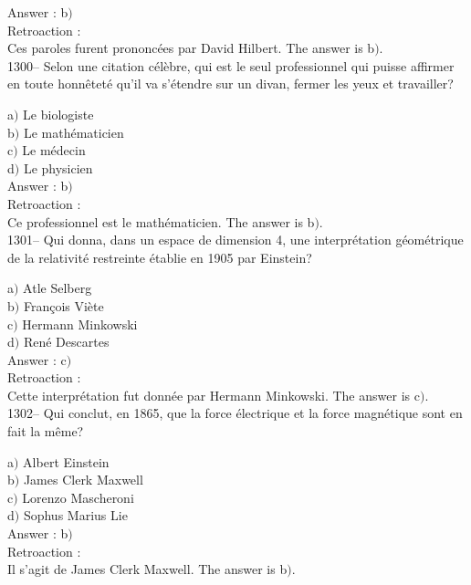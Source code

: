 ﻿\documentclass[letterpaper, 12pt]{article}
\begin{document}
Answer : b$)$\\

Retroaction : \\
Ces paroles furent prononc\'ees par David Hilbert.
The answer is  b$)$.\\

1300-- Selon une citation c\'el\`ebre, qui est le seul professionnel
qui puisse affirmer en toute honn\^etet\'e qu'il va s'\'etendre sur
un divan, fermer les yeux et travailler?

a$)$ Le biologiste \\
b$)$ Le math\'ematicien \\
c$)$ Le m\'edecin \\
d$)$ Le physicien\\

Answer : b$)$\\

Retroaction : \\
Ce professionnel est le math\'ematicien.
The answer is  b$)$.\\

1301-- Qui donna, dans un espace de dimension 4, une
interpr\'etation g\'eom\'etrique de la relativit\'e restreinte
\'etablie en 1905 par Einstein?

a$)$ Atle Selberg \\
b$)$ Fran\c cois Vi\`ete \\
c$)$ Hermann Minkowski \\
d$)$ Ren\'e Descartes\\

Answer : c$)$\\

Retroaction : \\
Cette interpr\'etation fut donn\'ee par Hermann Minkowski.
The answer is  c$)$.\\

1302-- Qui conclut, en 1865, que la force \'electrique et la force
magn\'etique sont en fait la m\^eme?

a$)$ Albert Einstein \\
b$)$ James Clerk Maxwell \\
c$)$ Lorenzo Mascheroni\\
d$)$ Sophus Marius Lie\\

Answer : b$)$\\

Retroaction : \\
Il s'agit de James Clerk Maxwell.
The answer is  b$)$.\\
\end{document}
